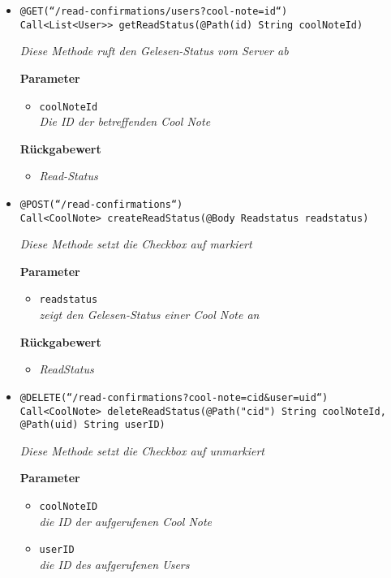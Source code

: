     \begin{itemize}
		\item\texttt{{@GET(``/read-confirmations/users?cool-note={id}``) \\ Call<List<User>> getReadStatus(@Path(\grqq id\grqq) String coolNoteId)}}

		\textit{Diese Methode ruft den Gelesen-Status vom Server ab}

		\textbf{Parameter} 
			\begin{itemize}
				\item\texttt{coolNoteId}\\
		 		\textit{Die ID der betreffenden Cool Note}
	 		\end{itemize}

		\textbf{Rückgabewert} 
		\begin{itemize}
		\item\textit{Read-Status}
		\end{itemize}

	\item\texttt{{@POST(``/read-confirmations``) \\ Call<CoolNote> createReadStatus(@Body Readstatus readstatus) }}

		\textit{Diese Methode setzt die Checkbox auf markiert}

		\textbf{Parameter} 
			\begin{itemize}
				\item\texttt{readstatus}\\
		 		\textit{zeigt den Gelesen-Status einer Cool Note an}
	 		\end{itemize}

		\textbf{Rückgabewert} 
		\begin{itemize}
		\item\textit{ReadStatus}
		\end{itemize}



	\item\texttt{{@DELETE(``/read-confirmations?cool-note={cid}\&user={uid}``)
\\Call<CoolNote> deleteReadStatus(@Path("cid") String coolNoteId,
			     @Path(\grqq uid\grqq) String userID)}}

		\textit{Diese Methode setzt die Checkbox auf unmarkiert}

		\textbf{Parameter} 
			\begin{itemize}
				\item\texttt{coolNoteID}\\
		 		\textit{die ID der aufgerufenen Cool Note}
		 		\item\texttt{userID}\\
		 		\textit{die ID des aufgerufenen Users}
	 		\end{itemize}
	
	 \end{itemize}


